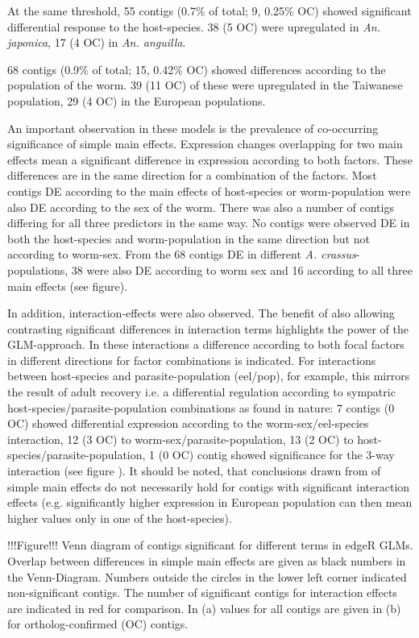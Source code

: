 \documentclass[10pt]{article}
\begin{document}
At the same threshold, 55 contigs (0.7\% of total; 9, 0.25\% OC)
showed significant differential response to the host-species. 38 (5
OC) were upregulated in \textit{An. japonica}, 17 (4 OC) in
\textit{An. anguilla}.

68 contigs (0.9\% of total; 15, 0.42\% OC) showed differences
according to the population of the worm. 39 (11 OC) of these were
upregulated in the Taiwanese population, 29 (4 OC) in the European
populations.

An important observation in these models is the prevalence of
co-occurring significance of simple main effects. Expression changes
overlapping for two main effects mean a significant difference in
expression according to both factors. These differences are in the
same direction for a combination of the factors. Most contigs DE
according to the main effects of host-species or worm-population were
also DE according to the sex of the worm. There was also a number of
contigs differing for all three predictors in the same way. No contigs
were observed DE in both the host-species and worm-population in the
same direction but not according to worm-sex. From the 68 contigs DE
in different \textit{A. crassus}-populations, 38 were also DE
according to worm sex and 16 according to all three main effects (see
figure).

In addition, interaction-effects were also observed. The benefit of
also allowing contrasting significant differences in interaction terms
highlights the power of the GLM-approach. In these interactions a
difference according to both focal factors in different directions for
factor combinations is indicated. For interactions between
host-species and parasite-population (eel/pop), for example, this
mirrors the result of adult recovery i.e. a differential regulation
according to sympatric host-species/parasite-population combinations
as found in nature: 7 contigs (0 OC) showed differential expression
according to the worm-sex/eel-species interaction, 12 (3 OC) to
worm-sex/parasite-population, 13 (2 OC) to
host-species/parasite-population, 1 (0 OC) contig showed significance
for the 3-way interaction (see figure ). It should
be noted, that conclusions drawn from of simple main effects do not
necessarily hold for contigs with significant interaction effects
(e.g. significantly higher expression in European population can then
mean higher values only in one of the host-species).

!!!Figure!!! Venn diagram of contigs significant for different terms
in edgeR GLMs. Overlap between differences in simple main effects are
given as black numbers in the Venn-Diagram. Numbers outside the
circles in the lower left corner indicated non-significant
contigs. The number of significant contigs for interaction effects are
indicated in red for comparison. In (a) values for all contigs are
given in (b) for ortholog-confirmed (OC) contigs.
\end{document}
